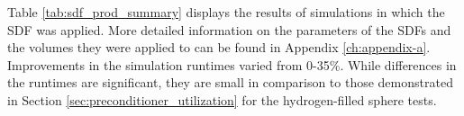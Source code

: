 Table \ref{tab:sdf_prod_summary} displays the results of simulations in which
the SDF was applied. More detailed information on the parameters of the SDFs and
the volumes they were applied to can be found in Appendix
\ref{ch:appendix-a}. Improvements in the simulation runtimes varied from
0-35\%. While differences in the runtimes are significant, they are small in
comparison to those demonstrated in Section \ref{sec:preconditioner_utilization}
for the hydrogen-filled sphere tests.


\setcounter{footnote}{1}

\begin{table}[H]
  \small
  \caption{An summary of the relative number of calls to the various Monte Carlo
    geometric queries for several DAGMC production models. \protect\footnotemark}
  \label{tab:geom_query_ratios}
\end{table}  

